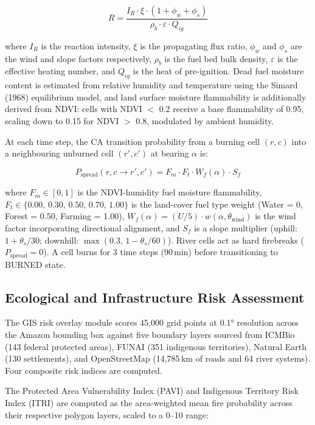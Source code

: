 \documentclass[12pt,a4paper]{article}
\begin{document}
\begin{equation}
R = \frac{I_R \cdot \xi \cdot (1 + \phi_w + \phi_s)}{\rho_b \cdot \varepsilon \cdot Q_{ig}}
\end{equation}

where $I_R$ is the reaction intensity, $\xi$ is the propagating flux ratio, $\phi_w$ and $\phi_s$ are the wind and slope factors respectively, $\rho_b$ is the fuel bed bulk density, $\varepsilon$ is the effective heating number, and $Q_{ig}$ is the heat of pre-ignition. Dead fuel moisture content is estimated from relative humidity and temperature using the Simard (1968) equilibrium model, and land surface moisture flammability is additionally derived from NDVI: cells with NDVI $<$ 0.2 receive a base flammability of 0.95, scaling down to 0.15 for NDVI $>$ 0.8, modulated by ambient humidity.

At each time step, the CA transition probability from a burning cell $(r,c)$ into a neighbouring unburned cell $(r',c')$ at bearing $\alpha$ is:

\begin{equation}
P_{\text{spread}}(r,c \to r',c') = F_m \cdot F_t \cdot W_f(\alpha) \cdot S_f
\end{equation}

where $F_m \in [0,1]$ is the NDVI-humidity fuel moisture flammability, $F_t \in \{0.00,\, 0.30,\, 0.50,\, 0.70,\, 1.00\}$ is the land-cover fuel type weight (Water = 0, Forest = 0.50, Farming = 1.00), $W_f(\alpha) = (U/5)\cdot w(\alpha, \theta_{\text{wind}})$ is the wind factor incorporating directional alignment, and $S_f$ is a slope multiplier (uphill: $1 + \theta_s/30$; downhill: $\max(0.3,\, 1 - \theta_s/60)$). River cells act as hard firebreaks ($P_{\text{spread}} = 0$). A cell burns for 3 time steps (90\,min) before transitioning to BURNED state.

\subsection{Ecological and Infrastructure Risk Assessment}

The GIS risk overlay module scores 45,000 grid points at 0.1° resolution across the Amazon bounding box against five boundary layers sourced from ICMBio (143 federal protected areas), FUNAI (351 indigenous territories), Natural Earth (130 settlements), and OpenStreetMap (14,785\,km of roads and 64 river systems). Four composite risk indices are computed.

The Protected Area Vulnerability Index (PAVI) and Indigenous Territory Risk Index (ITRI) are computed as the area-weighted mean fire probability across their respective polygon layers, scaled to a 0--10 range:
\end{document}
